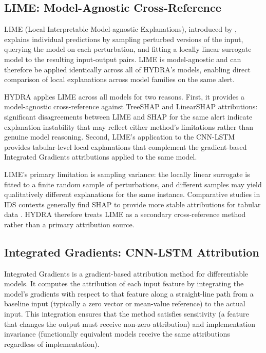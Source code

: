 \documentclass[12pt,a4paper]{report}
\begin{document}
\subsection{LIME: Model-Agnostic Cross-Reference}
\label{sec:lime}

LIME (Local Interpretable Model-agnostic Explanations), introduced by \citet{ribeiro2016}, explains individual predictions by sampling perturbed versions of the input, querying the model on each perturbation, and fitting a locally linear surrogate model to the resulting input-output pairs. LIME is model-agnostic and can therefore be applied identically across all of HYDRA's models, enabling direct comparison of local explanations across model families on the same alert.

HYDRA applies LIME across all models for two reasons. First, it provides a model-agnostic cross-reference against TreeSHAP and LinearSHAP attributions: significant disagreements between LIME and SHAP for the same alert indicate explanation instability that may reflect either method's limitations rather than genuine model reasoning. Second, LIME's application to the CNN-LSTM provides tabular-level local explanations that complement the gradient-based Integrated Gradients attributions applied to the same model.

LIME's primary limitation is sampling variance: the locally linear surrogate is fitted to a finite random sample of perturbations, and different samples may yield qualitatively different explanations for the same instance. Comparative studies in IDS contexts generally find SHAP to provide more stable attributions for tabular data \citep{viirlaid2025}. HYDRA therefore treats LIME as a secondary cross-reference method rather than a primary attribution source.

\subsection{Integrated Gradients: CNN-LSTM Attribution}
\label{sec:ig}

Integrated Gradients \citep{sundararajan2017} is a gradient-based attribution method for differentiable models. It computes the attribution of each input feature by integrating the model's gradients with respect to that feature along a straight-line path from a baseline input (typically a zero vector or mean-value reference) to the actual input. This integration ensures that the method satisfies sensitivity (a feature that changes the output must receive non-zero attribution) and implementation invariance (functionally equivalent models receive the same attributions regardless of implementation).
\end{document}
